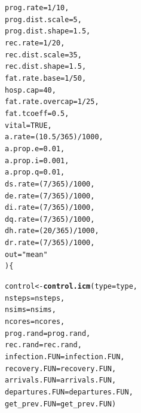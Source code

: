 \documentclass{article}\usepackage[]{graphicx}\usepackage[]{color}
\makeatletter
\newcommand{\hlnum}[1]{\textcolor[rgb]{0.686,0.059,0.569}{#1}}%
\newcommand{\hlstr}[1]{\textcolor[rgb]{0.192,0.494,0.8}{#1}}%
\newcommand{\hlopt}[1]{\textcolor[rgb]{0,0,0}{#1}}%
\newcommand{\hlstd}[1]{\textcolor[rgb]{0.345,0.345,0.345}{#1}}%
\newcommand{\hlkwb}[1]{\textcolor[rgb]{0.69,0.353,0.396}{#1}}%
\newcommand{\hlkwc}[1]{\textcolor[rgb]{0.333,0.667,0.333}{#1}}%
\newcommand{\hlkwd}[1]{\textcolor[rgb]{0.737,0.353,0.396}{\textbf{#1}}}%
\newenvironment{kframe}{%
 \def\at@end@of@kframe{}%
 \ifinner\ifhmode%
  \def\at@end@of@kframe{\end{minipage}}%
  \begin{minipage}{\columnwidth}%
 \fi\fi%
 \def\FrameCommand##1{\hskip\@totalleftmargin \hskip-\fboxsep
 \colorbox{shadecolor}{##1}\hskip-\fboxsep
     \hskip-\linewidth \hskip-\@totalleftmargin \hskip\columnwidth}%
 \MakeFramed {\advance\hsize-\width
   \@totalleftmargin\z@ \linewidth\hsize
   \@setminipage}}%
 {\par\unskip\endMakeFramed%
 \at@end@of@kframe}
\newenvironment{knitrout}{}{} %
\makeatother
\begin{document}
\begin{knitrout}
\begin{kframe}
\begin{alltt}
                     \hlkwc{prog.rate} \hlstd{=} \hlnum{1}\hlopt{/}\hlnum{10}\hlstd{,}
                     \hlkwc{prog.dist.scale} \hlstd{=} \hlnum{5}\hlstd{,}
                     \hlkwc{prog.dist.shape} \hlstd{=} \hlnum{1.5}\hlstd{,}
                     \hlkwc{rec.rate} \hlstd{=} \hlnum{1}\hlopt{/}\hlnum{20}\hlstd{,}
                     \hlkwc{rec.dist.scale} \hlstd{=} \hlnum{35}\hlstd{,}
                     \hlkwc{rec.dist.shape} \hlstd{=} \hlnum{1.5}\hlstd{,}
                     \hlkwc{fat.rate.base} \hlstd{=} \hlnum{1}\hlopt{/}\hlnum{50}\hlstd{,}
                     \hlkwc{hosp.cap} \hlstd{=} \hlnum{40}\hlstd{,}
                     \hlkwc{fat.rate.overcap} \hlstd{=} \hlnum{1}\hlopt{/}\hlnum{25}\hlstd{,}
                     \hlkwc{fat.tcoeff} \hlstd{=} \hlnum{0.5}\hlstd{,}
                     \hlkwc{vital} \hlstd{=} \hlnum{TRUE}\hlstd{,}
                     \hlkwc{a.rate} \hlstd{= (}\hlnum{10.5}\hlopt{/}\hlnum{365}\hlstd{)}\hlopt{/}\hlnum{1000}\hlstd{,}
                     \hlkwc{a.prop.e} \hlstd{=} \hlnum{0.01}\hlstd{,}
                     \hlkwc{a.prop.i} \hlstd{=} \hlnum{0.001}\hlstd{,}
                     \hlkwc{a.prop.q} \hlstd{=} \hlnum{0.01}\hlstd{,}
                     \hlkwc{ds.rate} \hlstd{= (}\hlnum{7}\hlopt{/}\hlnum{365}\hlstd{)}\hlopt{/}\hlnum{1000}\hlstd{,}
                     \hlkwc{de.rate} \hlstd{= (}\hlnum{7}\hlopt{/}\hlnum{365}\hlstd{)}\hlopt{/}\hlnum{1000}\hlstd{,}
                     \hlkwc{di.rate} \hlstd{= (}\hlnum{7}\hlopt{/}\hlnum{365}\hlstd{)}\hlopt{/}\hlnum{1000}\hlstd{,}
                     \hlkwc{dq.rate} \hlstd{= (}\hlnum{7}\hlopt{/}\hlnum{365}\hlstd{)}\hlopt{/}\hlnum{1000}\hlstd{,}
                     \hlkwc{dh.rate} \hlstd{= (}\hlnum{20}\hlopt{/}\hlnum{365}\hlstd{)}\hlopt{/}\hlnum{1000}\hlstd{,}
                     \hlkwc{dr.rate} \hlstd{= (}\hlnum{7}\hlopt{/}\hlnum{365}\hlstd{)}\hlopt{/}\hlnum{1000}\hlstd{,}
                     \hlkwc{out}\hlstd{=}\hlstr{"mean"}
                    \hlstd{) \{}

  \hlstd{control} \hlkwb{<-} \hlkwd{control.icm}\hlstd{(}\hlkwc{type} \hlstd{= type,}
                         \hlkwc{nsteps} \hlstd{= nsteps,}
                         \hlkwc{nsims} \hlstd{= nsims,}
                         \hlkwc{ncores} \hlstd{= ncores,}
                         \hlkwc{prog.rand} \hlstd{= prog.rand,}
                         \hlkwc{rec.rand} \hlstd{= rec.rand,}
                         \hlkwc{infection.FUN} \hlstd{= infection.FUN,}
                         \hlkwc{recovery.FUN} \hlstd{= recovery.FUN,}
                         \hlkwc{arrivals.FUN} \hlstd{= arrivals.FUN,}
                         \hlkwc{departures.FUN} \hlstd{= departures.FUN,}
                         \hlkwc{get_prev.FUN} \hlstd{= get_prev.FUN)}


\end{alltt}
\end{kframe}
\end{knitrout}
\end{document}
